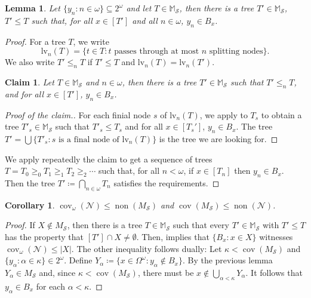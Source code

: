 \documentclass[a4paper,12pt]{amsart}
\newtheorem{lem}[thm]{Lemma}
\newtheorem{cor}[thm]{Corollary}
\newtheorem{claim}[thm]{Claim}
\theoremstyle{definition}
\numberwithin{thm}{section}
\numberwithin{equation}{section}
\DeclareMathOperator{\non}{non}
\DeclareMathOperator{\cov}{cov}
\newcommand{\covomn}{\operatorname{cov}_\omega(\mathcal{N})}
\newcommand{\cantor}{2^{\omega}}
\newcommand{\covo}[1]{\cov_\omega(#1)}
\newcommand{\Solecki}{\mathcal{S}}
\begin{document}
    \begin{lem}\label{lem:Solecki_omega_cover}
        Let $\{ y_n : n \in \omega \} \subseteq \cantor$ and let $T \in \mathbb{M}_\Solecki$, then there is a tree $T' \in \mathbb{M}_\Solecki$, $T' \leq T$ such that, for all $x \in [T']$ and all $n \in \omega$, $y_n \in B_x$.
    \end{lem}
    \begin{proof}
        For a tree $T$, we write
        \[
        \mathrm{lv}_n (T) = \{ t \in T : t \text{ passes through at most }n \text{ splitting nodes} \}.
        \]
        We also write $T' \leq_n T$ if $T' \leq T$ and $\mathrm{lv}_n (T) = \mathrm{lv}_n(T')$. 
    
        \begin{claim}
            Let $T \in \mathbb{M}_\Solecki$ and $n \in \omega$, then there is a tree $T' \in \mathbb{M}_\Solecki$ such that $T' \leq_n T$, and for all $x \in [T']$, $y_n \in B_x$.
        \end{claim}
        \begin{proof}[Proof of the claim.]
            For each finial node $s$ of $\mathrm{lv}_n(T)$, we apply  to $T_s$ to obtain a tree $T'_s\in\mathbb{M}_\Solecki$ such that $T'_s \leq T_s$ and for all $x \in [T_s']$, $y_n \in B_x$. The tree $T' = \bigcup \{ T'_s : s \text{ is a final node of lv}_n(T) \}$ is the tree we are looking for.
        \end{proof}
        
        We apply repeatedly the claim to get a sequence of trees $T = T_0 \geq_0 T_1 \geq_1 T_2 \geq_2 \cdots$ such that, for all $n<\omega$, if $x \in [T_n]$ then $y_n \in B_x$. Then the tree $T' \coloneqq \bigcap_{n \in \omega}T_n$ satisfies the requirements.
    \end{proof}

    \begin{cor}\label{cor:nonMSolecki}
        $\covo{\mathcal{N}} \leq \non(M_\Solecki)$ and $\cov(M_\Solecki) \leq \non(\mathcal{N})$.
    \end{cor}
    \begin{proof}
        If $X \notin M_\Solecki$, then there is a tree $T \in \mathbb{M}_\Solecki$ such that every $T' \in \mathbb{M}_\Solecki$ with $T' \leq T$ has the property that $[T'] \cap X \neq \emptyset$. Then,  implies that $\{ B_x : x \in X \}$ witnesses $\covomn\leq|X|$. 
        The other inequality follows dually: Let $\kappa < \cov(M_\Solecki)$ and $\{y_\alpha : \alpha \in \kappa\} \in \cantor$. Define $Y_\alpha \coloneqq \{ x \in \Omega^\omega : y_\alpha \notin B_x \}$. By the previous lemma $Y_\alpha \in M_\Solecki$ and, since $\kappa < \cov(M_\Solecki)$, there must be $x \notin \bigcup_{\alpha < \kappa} Y_\alpha$. It follows that $y_\alpha \in B_x$ for each $\alpha < \kappa$.
    \end{proof}
\end{document}
